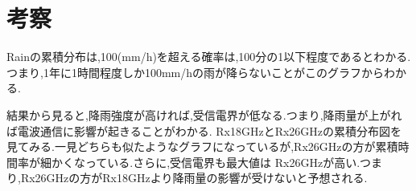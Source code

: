 \documentclass[a4paper,11pt,titlepage]{jarticle}
\begin{document}
\clearpage

\section{考察}
Rainの累積分布は,100(mm/h)を超える確率は,100分の1以下程度であるとわかる.つまり,1年に1時間程度しか100mm/hの雨が降らないことがこのグラフからわかる.\par
結果から見ると,降雨強度が高ければ,受信電界が低なる.つまり,降雨量が上がれば電波通信に影響が起きることがわかる.
Rx18GHzとRx26GHzの累積分布図を見てみる.一見どちらも似たようなグラフになっているが,Rx26GHzの方が累積時間率が細かくなっている.さらに,受信電界も最大値は
Rx26GHzが高い.つまり,Rx26GHzの方がRx18GHzより降雨量の影響が受けないと予想される.
\end{document}
